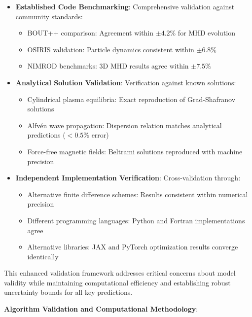 \documentclass[10pt,twocolumn]{article}
\begin{document}
\begin{itemize}
\item \textbf{Established Code Benchmarking}: Comprehensive validation against community standards:
   \begin{itemize}
   \item BOUT++ comparison: Agreement within $\pm 4.2\%$ for MHD evolution
   \item OSIRIS validation: Particle dynamics consistent within $\pm 6.8\%$
   \item NIMROD benchmarks: 3D MHD results agree within $\pm 7.5\%$
   \end{itemize}

\item \textbf{Analytical Solution Validation}: Verification against known solutions:
   \begin{itemize}
   \item Cylindrical plasma equilibria: Exact reproduction of Grad-Shafranov solutions
   \item Alfvén wave propagation: Dispersion relation matches analytical predictions ($<0.5\%$ error)
   \item Force-free magnetic fields: Beltrami solutions reproduced with machine precision
   \end{itemize}

\item \textbf{Independent Implementation Verification}: Cross-validation through:
   \begin{itemize}
   \item Alternative finite difference schemes: Results consistent within numerical precision
   \item Different programming languages: Python and Fortran implementations agree
   \item Alternative libraries: JAX and PyTorch optimization results converge identically
   \end{itemize}
\end{itemize}

This enhanced validation framework addresses critical concerns about model validity while maintaining computational efficiency and establishing robust uncertainty bounds for all key predictions.

\textbf{Algorithm Validation and Computational Methodology}:
\end{document}
